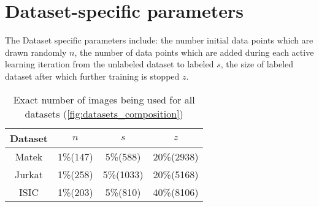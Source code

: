 \section{Dataset-specific parameters}\label{section:dataset_specific_parameters}
The Dataset specific parameters include: the number initial data points which are drawn randomly $n$, the number of data points which are added during each active learning iteration from the unlabeled dataset to labeled $s$, the size of labeled dataset after which further training is stopped $z$.
\vspace{0.5cm}
\begin{table}[htbp]
\captionsetup{format=plain}
\centering
 \begin{tabular}{c c c c} 
 \hline
 Dataset & $n$ & $s$ & $z$ \\ [0.5ex] 
 \hline
 Matek & 1\%\hspace{0.35cm}(147) & 5\%\hspace{0.35cm}(588) & 20\%\hspace{0.35cm}(2938) \\ 
 Jurkat & 1\%\hspace{0.35cm}(258) & \hspace{0.20cm}5\%\hspace{0.35cm}(1033) & 20\%\hspace{0.35cm}(5168) \\
 ISIC & 1\%\hspace{0.35cm}(203) & 5\%\hspace{0.35cm}(810) & 40\%\hspace{0.35cm}(8106) \\
 \hline
\end{tabular}
\caption{Exact number of images being used for all datasets (\ref{fig:datasets_composition})}
\label{table:datasets_splits}
\end{table}